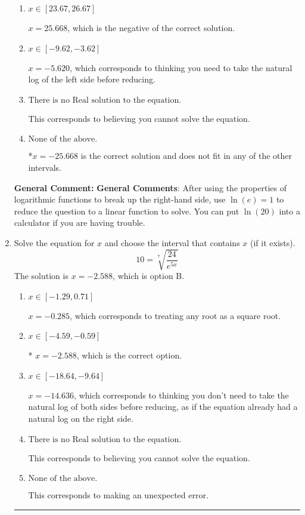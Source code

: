 \documentclass{extbook}[14pt]
\newcommand{\litem}[1]{\item #1

\rule{\textwidth}{0.4pt}}
\begin{document}
\begin{enumerate}
{\begin{enumerate}[label=\Alph*.]
$x = -9.668$, which corresponds to treating any root as a square root.
\item \( x \in [23.67, 26.67] \)

$x = 25.668$, which is the negative of the correct solution.
\item \( x \in [-9.62, -3.62] \)

$x = -5.620$, which corresponds to thinking you need to take the natural log of the left side before reducing.
\item \( \text{There is no Real solution to the equation.} \)

This corresponds to believing you cannot solve the equation.
\item \( \text{None of the above.} \)

*$x = -25.668$ is the correct solution and does not fit in any of the other intervals.
\end{enumerate}

\textbf{General Comment:} \textbf{General Comments}: After using the properties of logarithmic functions to break up the right-hand side, use $\ln(e) = 1$ to reduce the question to a linear function to solve. You can put $\ln(20)$ into a calculator if you are having trouble.
}
\litem{
 Solve the equation for $x$ and choose the interval that contains $x$ (if it exists).
\[  10 = \sqrt[7]{\frac{24}{e^{5x}}} \]The solution is \( x = -2.588 \), which is option B.\begin{enumerate}[label=\Alph*.]
\item \( x \in [-1.29, 0.71] \)

$x = -0.285$, which corresponds to treating any root as a square root.
\item \( x \in [-4.59, -0.59] \)

* $x = -2.588$, which is the correct option.
\item \( x \in [-18.64, -9.64] \)

$x = -14.636$, which corresponds to thinking you don't need to take the natural log of both sides before reducing, as if the equation already had a natural log on the right side.
\item \( \text{There is no Real solution to the equation.} \)

This corresponds to believing you cannot solve the equation.
\item \( \text{None of the above.} \)

This corresponds to making an unexpected error.
\end{enumerate}

}
\end{enumerate}
\end{document}
